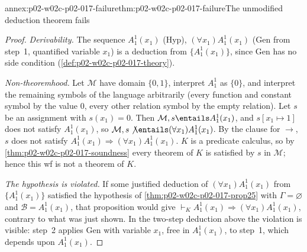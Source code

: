 \begin{annexitem}{annex:p02-w02c-p02-017-failure}{thm:p02-w02c-p02-017-failure}{The unmodified deduction theorem fails}
\begin{proof}
\emph{Derivability.}  The sequence \(A^1_1(x_1)\) (Hyp),
\((\forall x_1)A^1_1(x_1)\) (Gen from step~1, quantified variable \(x_1\)) is
a deduction from \(\{A^1_1(x_1)\}\), since Gen has no side condition
(\cref{def:p02-w02c-p02-017-theory}).

\emph{Non-theoremhood.}  Let \(\mathcal M\) have domain \(\{0,1\}\),
interpret \(A^1_1\) as \(\{0\}\), and interpret the remaining symbols of the
language arbitrarily (every function and constant symbol by the value \(0\),
every other relation symbol by the empty relation).  Let \(s\) be an
assignment with \(s(x_1)=0\).  Then \(\mathcal M,s\entails A^1_1(x_1)\), and
\(s[x_1\mapsto1]\) does not satisfy \(A^1_1(x_1)\), so
\(\mathcal M,s\not\entails(\forall x_1)A^1_1(x_1)\).  By the clause for
\(\to\), \(s\) does not satisfy
\(A^1_1(x_1)\Rightarrow(\forall x_1)A^1_1(x_1)\).  \(K\) is a predicate
calculus, so by \cref{thm:p02-w02c-p02-017-soundness} every theorem of \(K\)
is satisfied by \(s\) in \(\mathcal M\); hence this wf is not a theorem of
\(K\).

\emph{The hypothesis is violated.}  If some justified deduction of
\((\forall x_1)A^1_1(x_1)\) from \(\{A^1_1(x_1)\}\) satisfied the hypothesis of
\cref{thm:p02-w02c-p02-017-prop25} with \(\Gamma=\varnothing\) and
\(\mathscr B=A^1_1(x_1)\), that proposition would give
\(\vdash_K A^1_1(x_1)\Rightarrow(\forall x_1)A^1_1(x_1)\), contrary to what
was just shown.  In the two-step deduction above the violation is visible:
step~2 applies Gen with variable \(x_1\), free in \(A^1_1(x_1)\), to step~1,
which depends upon \(A^1_1(x_1)\).
\end{proof}
\end{annexitem}
